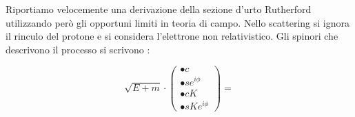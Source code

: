 Riportiamo velocemente una derivazione della sezione d'urto Rutherford utilizzando però gli opportuni limiti in teoria di campo. Nello scattering si ignora il rinculo del protone e si considera l'elettrone non relativistico. Gli spinori che descrivono il processo si scrivono :

\begin{equation}
\sqrt{E + m}\cdot
\left (\begin{array}{c}
• c \\ 
• s e^{i\phi} \\ 
• c K\\ 
• s K e^{i\phi}
\end{array} \right ) = 

\end{equation}